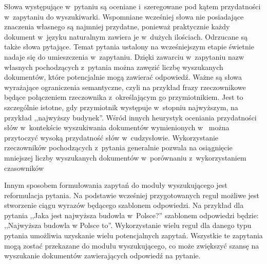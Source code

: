 \documentclass[a4paper, twoside, 12pt]{report}
\begin{document}
            Słowa występujące w~pytaniu są oceniane i~szeregowane pod kątem przydatności w~zapytaniu do wyszukiwarki.
            Wspomniane wcześniej słowa nie posiadające znaczenia własnego są najmniej przydatne, ponieważ praktycznie
            każdy dokument w~języku naturalnym zawiera je w~dużych ilościach. Odrzucane są także słowa pytające. Temat
            pytania ustalony na wcześniejszym etapie świetnie nadaje się do umieszczenia w~zapytaniu. Dzięki zawarciu
            w~zapytaniu nazw własnych pochodzących z~pytania można zawęzić liczbę wyszukanych dokumentów, które potencjalnie
            mogą zawierać odpowiedź. Ważne są słowa wyrażające ograniczenia semantyczne, czyli na przykład frazy
            rzeczownikowe będące połączeniem rzeczownika z~określającym go przymiotnikiem. Jest to szczególnie istotne,
            gdy przymiotnik występuje w~stopniu najwyższym, na przykład ,,najwyższy budynek''. Wśród innych heurystyk
            oceniania przydatności słów w~kontekście wyszukiwania dokumentów wymienionych w~\cite{PASZKA} można
            przytoczyć wysoką przydatność słów w~cudzysłowie. Wykorzystanie rzeczowników pochodzących z~pytania generalnie
            pozwala na osiągnięcie mniejszej liczby wyszukanych dokumentów w~porównaniu z~wykorzystaniem czasowników

            Innym sposobem formułowania zapytań do moduły wyszukującego jest reformulacja pytania. Na podstawie wcześniej
            przygotowanych reguł możliwe jest stworzenie ciągu wyrazów będącego szablonem odpowiedzi. Na przykład
            dla pytania ,,Jaka jest najwyższa budowla w~Polsce?'' szablonem odpowiedzi będzie: ,,Najwyższa budowla w
            Polsce to''. Wykorzystanie wielu reguł dla danego typu pytania umożliwia uzyskanie wielu potencjalnych
            zapytań. Wszystkie te zapytania mogą zostać przekazane do modułu wyszukującego, co może zwiększyć szansę na
            wyszukanie dokumentów zawierających odpowiedź na pytanie\cite{SPEECHANDLANGUAGEPROCESSING}.
\end{document}
